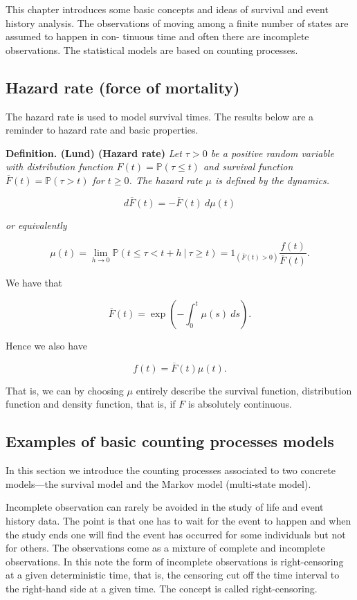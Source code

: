 \documentclass[a4paper,10pt,openany]{book}
\begin{document}
This chapter introduces some basic concepts and ideas of survival and event history analysis. The observations of moving among a finite number of states are assumed to happen in con- tinuous time and often there are incomplete observations. The statistical models are based on counting processes.

\hypertarget{hazard-rate-force-of-mortality}{%
\subsection{Hazard rate (force of mortality)}\label{hazard-rate-force-of-mortality}}

The hazard rate is used to model survival times. The results below are a reminder to hazard rate and basic properties.

\textbf{Definition. (Lund) (Hazard rate)} \emph{Let \(\tau>0\) be a positive random variable with distribution function \(F(t)=\mathbb P(\tau \le t)\) and survival function \(\overline F(t)=\mathbb P(\tau > t)\) for \(t\ge 0\). The hazard rate \(\mu\) is defined by the dynamics.}

\[
d\overline F(t)=-\overline F(t)\ d\mu(t)
\]

\emph{or equivalently}

\[
\mu(t)=\lim_{h\to 0}\mathbb P(t\le \tau < t+ h\ \vert\ \tau\ge t)=1_{(\overline F(t)>0)}\frac{f(t)}{\overline F(t)}.
\]

We have that

\[
\overline F(t)=\exp\left(-\int_0^t\mu(s)\ ds\right).
\]

Hence we also have

\[
f(t)=\overline F(t)\mu(t).
\]

That is, we can by choosing \(\mu\) entirely describe the survival function, distribution function and density function, that is, if \(F\) is absolutely continuous.

\hypertarget{examples-of-basic-counting-processes-models}{%
\subsection{Examples of basic counting processes models}\label{examples-of-basic-counting-processes-models}}

In this section we introduce the counting processes associated to two concrete models---the survival model and the Markov model (multi-state model).

Incomplete observation can rarely be avoided in the study of life and event history data. The point is that one has to wait for the event to happen and when the study ends one will find the event has occurred for some individuals but not for others. The observations come as a mixture of complete and incomplete observations. In this note the form of incomplete observations is right-censoring at a given deterministic time, that is, the censoring cut off the time interval to the right-hand side at a given time. The concept is called right-censoring.
\end{document}
